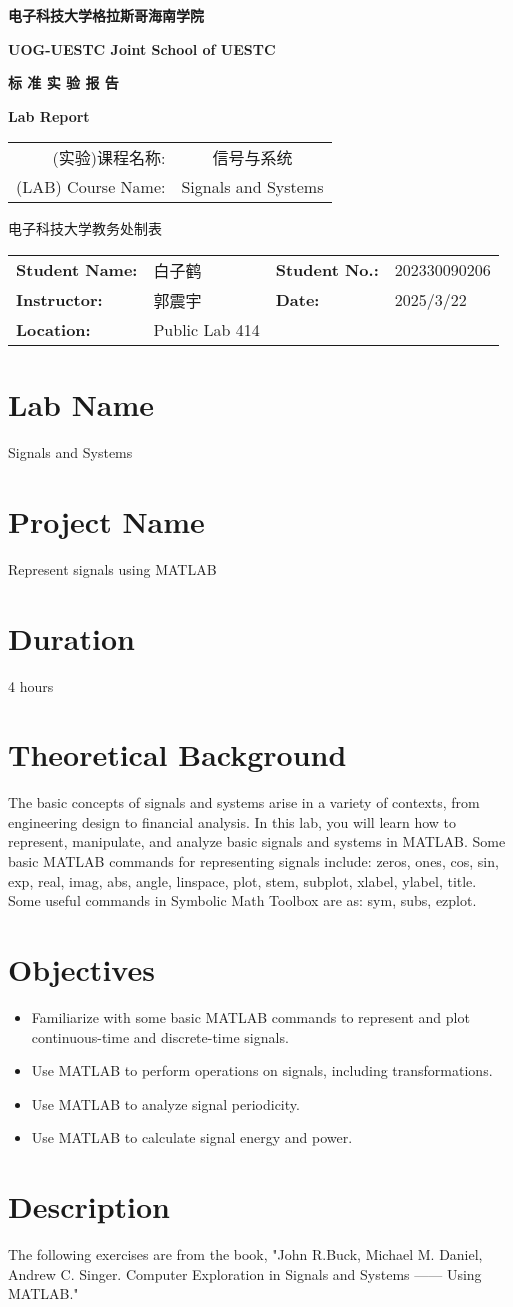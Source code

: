\documentclass[12pt]{article}
\makeatletter
\renewcommand{\maketitle}{
    \begin{titlepage}
        \begin{center}
            \vspace*{0cm}
            
            {\huge \kaishu \textbf{电子科技大学格拉斯哥海南学院}}
            
            \vspace{0.5cm}
            {\Large \textbf{UOG-UESTC Joint School of UESTC}}
            
            \vspace{4cm}
            
            {\Huge \kaishu \textbf{标 准 实 验 报 告}}
            
            \vspace{0.5cm}
            {\Large \textbf{Lab Report}}
            
            \vspace{4cm}
            
            \begin{center}
            \begin{tabular}{rc}
                \kaishu (实验)课程名称: & \kaishu 信号与系统 \\[0.5cm]
                (LAB) Course Name: & Signals and Systems
            \end{tabular}
            \end{center}
            
            \vfill
            
            {\large \kaishu 电子科技大学教务处制表}
        \end{center}
    \end{titlepage}
    
    \noindent
    \begin{tabular}{ll@{\hspace{4cm}}ll}
        \textbf{Student Name:} & 白子鹤 & \textbf{Student No.:} & 202330090206 \\[0.5cm]
        \textbf{Instructor:} & 郭震宇 & \textbf{Date:} & 2025/3/22 \\[0.5cm]
        \textbf{Location:} & Public Lab 414
    \end{tabular}
    
    \vspace{1cm}
}
\makeatother
\begin{document}
\maketitle

\section{Lab Name}
Signals and Systems

\section{Project Name}
Represent signals using MATLAB

\section{Duration}
4 hours

\section{Theoretical Background}
The basic concepts of signals and systems arise in a variety of contexts, from engineering design to financial analysis. In this lab, you will learn how to represent, manipulate, and analyze basic signals and systems in MATLAB. Some basic MATLAB commands for representing signals include: zeros, ones, cos, sin, exp, real, imag, abs, angle, linspace, plot, stem, subplot, xlabel, ylabel, title. Some useful commands in Symbolic Math Toolbox are as: sym, subs, ezplot.

\section{Objectives}
\begin{itemize}
    \item Familiarize with some basic MATLAB commands to represent and plot continuous-time and discrete-time signals.
    \item Use MATLAB to perform operations on signals, including transformations.
    \item Use MATLAB to analyze signal periodicity.
    \item Use MATLAB to calculate signal energy and power.
\end{itemize}

\section{Description}
The following exercises are from the book, "John R.Buck, Michael M. Daniel, Andrew C. Singer. Computer Exploration in Signals and Systems —— Using MATLAB."
\end{document}
